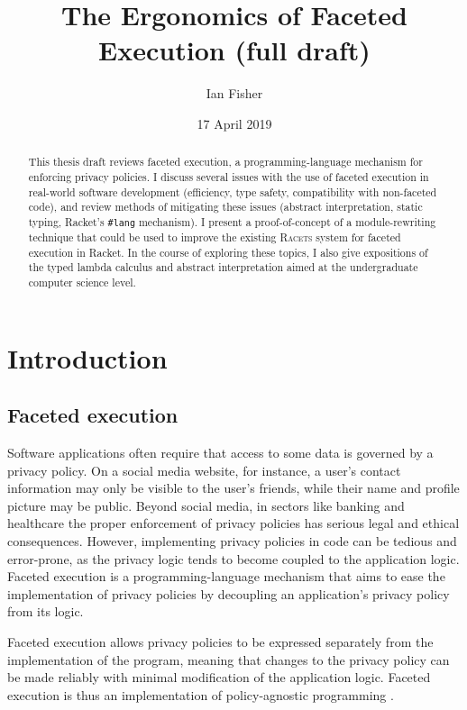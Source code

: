 \documentclass{article}
\title{The Ergonomics of Faceted Execution (full draft)}
\author{Ian Fisher}
\date{17 April 2019}
\begin{document}
\maketitle

\begin{abstract}
	This thesis draft reviews faceted execution, a programming-language mechanism for enforcing privacy policies. I discuss several issues with the use of faceted execution in real-world software development (efficiency, type safety, compatibility with non-faceted code), and review methods of mitigating these issues (abstract interpretation, static typing, Racket's \texttt{\#lang} mechanism). I present a proof-of-concept of a module-rewriting technique that could be used to improve the existing \textsc{Racets} system \cite{racets} for faceted execution in Racket. In the course of exploring these topics, I also give expositions of the typed lambda calculus and abstract interpretation aimed at the undergraduate computer science level.
\end{abstract}

\tableofcontents



\section{Introduction}
\subsection{Faceted execution\label{sec:facets}}
Software applications often require that access to some data is governed by a privacy policy. On a social media website, for instance, a user's contact information may only be visible to the user's friends, while their name and profile picture may be public. Beyond social media, in sectors like banking and healthcare the proper enforcement of privacy policies has serious legal and ethical consequences. However, implementing privacy policies in code can be tedious and error-prone, as the privacy logic tends to become coupled to the application logic. Faceted execution is a programming-language mechanism that aims to ease the implementation of privacy policies by decoupling an application's privacy policy from its logic.

Faceted execution allows privacy policies to be expressed separately from the implementation of the program, meaning that changes to the privacy policy can be made reliably with minimal modification of the application logic. Faceted execution is thus an implementation of policy-agnostic programming \cite{faceted}.
\end{document}
